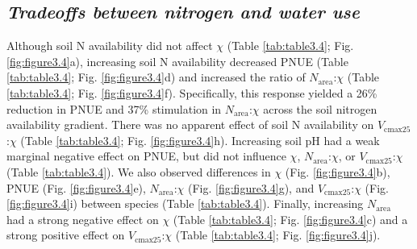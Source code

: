 \subsection{\textit{Tradeoffs between nitrogen and water use}}
Although soil N availability did not affect $\chi$ (Table \ref{tab:table3.4}; Fig. \ref{fig:figure3.4}a), increasing soil N availability decreased PNUE (Table \ref{tab:table3.4}; Fig. \ref{fig:figure3.4}d) and increased the ratio of $N_\mathrm{area}$:$\chi$ (Table \ref{tab:table3.4}; Fig. \ref{fig:figure3.4}f). Specifically, this response yielded a 26\% reduction in PNUE and 37\% stimulation in $N_\mathrm{area}$:$\chi$ across the soil nitrogen availability gradient. There was no apparent effect of soil N availability on $V_\mathrm{cmax25}$:$\chi$ (Table \ref{tab:table3.4}; Fig. \ref{fig:figure3.4}h). Increasing soil pH had a weak marginal negative effect on PNUE, but did not influence $\chi$, $N_\mathrm{area}$:$\chi$, or $V_\mathrm{cmax25}$:$\chi$ (Table \ref{tab:table3.4}). We also observed differences in $\chi$ (Fig. \ref{fig:figure3.4}b), PNUE (Fig. \ref{fig:figure3.4}e), $N_\mathrm{area}$:$\chi$ (Fig. \ref{fig:figure3.4}g), and $V_\mathrm{cmax25}$:$\chi$ (Fig. \ref{fig:figure3.4}i) between species (Table \ref{tab:table3.4}). Finally, increasing $N_\mathrm{area}$ had a strong negative effect on $\chi$ (Table \ref{tab:table3.4}; Fig. \ref{fig:figure3.4}c) and a strong positive effect on $V_\mathrm{cmax25}$:$\chi$ (Table \ref{tab:table3.4}; Fig. \ref{fig:figure3.4}j).
\clearpage

